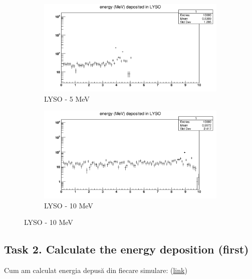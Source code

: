 \documentclass{article}
\begin{document}
\begin{figure}[H]
\medskip
\begin{subfigure}{0.48\textwidth}
\includegraphics[width=\linewidth]{images/task1/LYSO_5MeV.png}
\caption{LYSO - 5 MeV}
\end{subfigure}\hspace*{\fill}
\begin{subfigure}{0.48\textwidth}
\includegraphics[width=\linewidth]{images/task1/LYSO_10MeV.png}
\caption{LYSO - 10 MeV} 
\end{subfigure}

\end{figure}

\subsection{Task 2. Calculate the energy deposition (first)}

Cum am calculat energia depusă din fiecare simulare: (\href{https://github.com/rmiron30/tasks_geant4/blob/main/scintillator_task/optical_yield_task/histo_code.py}{link})



\end{document}
